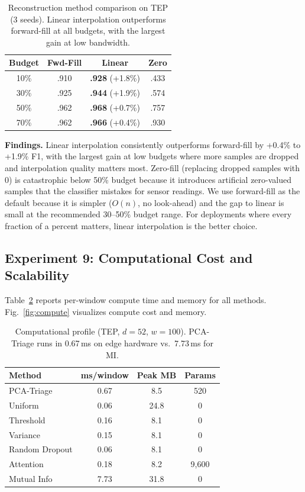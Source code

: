 \documentclass[journal]{IEEEtran}
\begin{document}
\begin{table}[t]
\centering
\caption{Reconstruction method comparison on TEP (3 seeds). Linear interpolation outperforms forward-fill at all budgets, with the largest gain at low bandwidth.}
\begin{tabular}{@{}cccc@{}}
\toprule
\textbf{Budget} & \textbf{Fwd-Fill} & \textbf{Linear} & \textbf{Zero} \\
\midrule
10\% & .910 & \textbf{.928} (+1.8\%) & .433 \\
30\% & .925 & \textbf{.944} (+1.9\%) & .574 \\
50\% & .962 & \textbf{.968} (+0.7\%) & .757 \\
70\% & .962 & \textbf{.966} (+0.4\%) & .930 \\
\bottomrule
\end{tabular}
\label{tab:recon}
\end{table}

\textbf{Findings.} Linear interpolation consistently outperforms forward-fill by +0.4\% to +1.9\% F1, with the largest gain at low budgets where more samples are dropped and interpolation quality matters most. Zero-fill (replacing dropped samples with 0) is catastrophic below 50\% budget because it introduces artificial zero-valued samples that the classifier mistakes for sensor readings. We use forward-fill as the default because it is simpler ($O(n)$, no look-ahead) and the gap to linear is small at the recommended 30--50\% budget range. For deployments where every fraction of a percent matters, linear interpolation is the better choice.

\subsection{Experiment 9: Computational Cost and Scalability}

Table~\ref{tab:compute} reports per-window compute time and memory for all methods. Fig.~\ref{fig:compute} visualizes compute cost and memory.

\begin{table}[t]
\centering
\caption{Computational profile (TEP, $d{=}52$, $w{=}100$). PCA-Triage runs in 0.67\,ms on edge hardware vs.\ 7.73\,ms for MI.}
\begin{tabular}{@{}lccc@{}}
\toprule
\textbf{Method} & \textbf{ms/window} & \textbf{Peak MB} & \textbf{Params} \\
\midrule
PCA-Triage & 0.67 & 8.5 & 520 \\
Uniform & 0.06 & 24.8 & 0 \\
Threshold & 0.16 & 8.1 & 0 \\
Variance & 0.15 & 8.1 & 0 \\
Random Dropout & 0.06 & 8.1 & 0 \\
Attention & 0.18 & 8.2 & 9,600 \\
Mutual Info & 7.73 & 31.8 & 0 \\
\bottomrule
\end{tabular}
\label{tab:compute}
\end{table}
\end{document}
